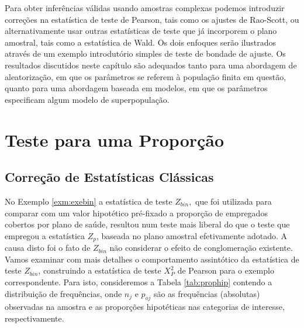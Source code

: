 \documentclass[]{book}
\theoremstyle{definition}
\theoremstyle{definition}
\theoremstyle{definition}
\theoremstyle{remark}
\begin{document}
Para obter inferências válidas usando amostras complexas podemos
introduzir correções na estatística de teste de Pearson, tais como os
ajustes de Rao-Scott, ou alternativamente usar outras estatísticas de
teste que já incorporem o plano amostral, tais como a estatística de
Wald. Os dois enfoques serão ilustrados através de um exemplo
introdutório simples de teste de bondade de ajuste. Os resultados
discutidos neste capítulo são adequados tanto para uma abordagem de
aleatorização, em que os parâmetros se referem à população finita em
questão, quanto para uma abordagem baseada em modelos, em que os
parâmetros especificam algum modelo de superpopulação.

\section{Teste para uma Proporção}\label{teste-para-uma-proporcao}

\subsection{Correção de Estatísticas
Clássicas}\label{correcao-de-estatisticas-classicas}

No Exemplo \ref{exm:exebin} a estatística de teste \(Z_{bin},\) que foi
utilizada para comparar com um valor hipotético pré-fixado a proporção
de empregados cobertos por plano de saúde, resultou num teste mais
liberal do que o teste que empregou a estatística \(Z_{p}\), baseada no
plano amostral efetivamente adotado. A causa disto foi o fato de
\(Z_{bin}\) não considerar o efeito de conglomeração existente. Vamos
examinar com mais detalhes o comportamento assintótico da estatística de
teste \(Z_{bin}\), construindo a estatística de teste \(X_{P}^{2}\) de
Pearson para o exemplo correspondente. Para isto, consideremos a Tabela
\ref{tab:prophip} contendo a distribuição de frequências, onde \(n_{j}\)
e \(p_{oj}\) são as frequências (absolutas) observadas na amostra e as
proporções hipotéticas nas categorias de interesse, respectivamente.
\end{document}
